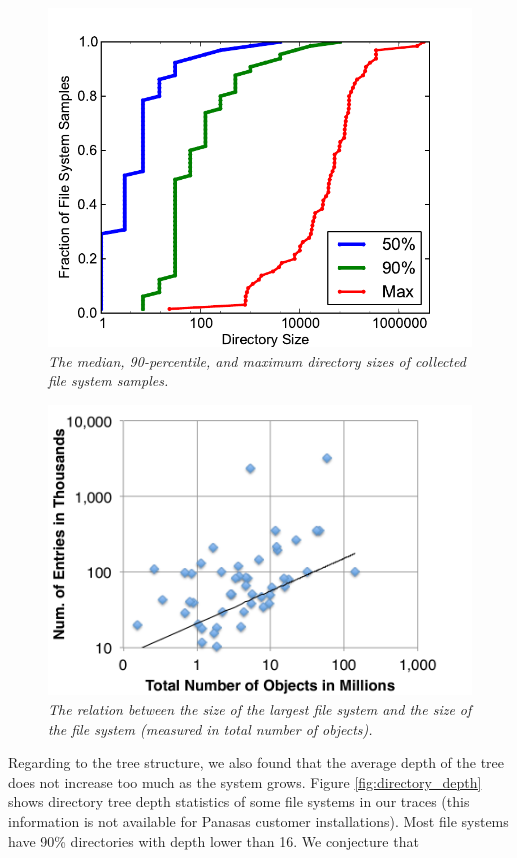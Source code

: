 \begin{figure}[!ht]
\center
\includegraphics[scale=0.5]{figs/directory_size}
\caption{\textit{The median, 90-percentile,
and maximum directory sizes of collected file system samples.
}}
\label{fig:directory_size}
\end{figure}

\begin{figure}[!ht]
\center
\includegraphics[scale=0.4]{figs/large_dir}
\caption{\textit{The relation between the size of the largest file system
and the size of the file system (measured in total number of objects).}}
\label{fig:large_directory}
\end{figure}

Regarding to the tree structure, we also found that the average depth
of the tree does not increase too much as the system grows.
Figure \ref{fig:directory_depth} shows directory tree
depth statistics of some file systems in our traces
(this information is not available for Panasas customer installations).
Most file systems have 90\% directories with depth lower than 16.
We conjecture that

